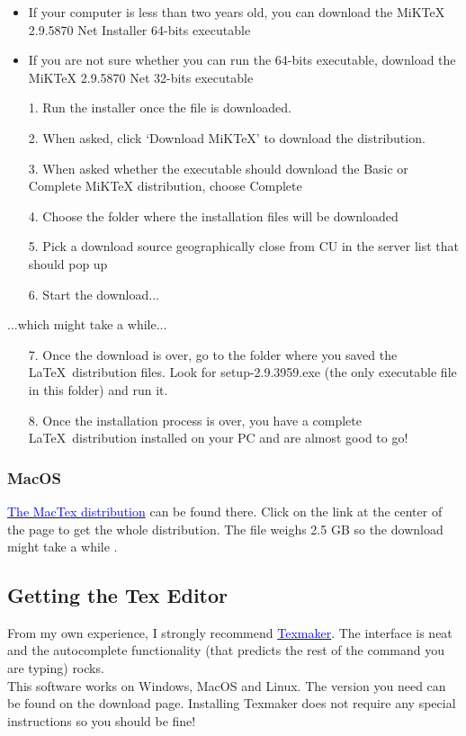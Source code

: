 \documentclass{report}
\begin{document}
\begin{itemize}
\item If your computer is less than two years old,
you can download the MiKTeX 2.9.5870 Net Installer 64-bits executable
\item If you are not sure whether you can run the 64-bits executable, 
download the MiKTeX 2.9.5870 Net 32-bits executable 
\end{itemize}


\begin{itemize}
\item[1.] Run the installer once the file is downloaded.
\item[2.] When asked, click ‘Download MiKTeX’ to download the distribution.
\item[3.] When asked whether the executable should download the Basic or Complete MiKTeX distribution, choose Complete
\item[4.] Choose the folder where the installation files will be downloaded
\item[5.] Pick a download source geographically close from CU in the server list that should pop up
\item[6.] Start the download...
\end{itemize}
...which might take a while...
\begin{itemize}
\item[7.] Once the download is over, go to the folder where you saved the \LaTeX\ distribution files. Look for setup-2.9.3959.exe (the only executable file in this folder) and run it.
\item[8.] Once the installation process is over, you have a complete \LaTeX\ distribution installed on your PC and are almost good to go!
\end{itemize}

\subsubsection*{MacOS}
\href{https://tug.org/mactex/mactex-download.html}{\textcolor{blue}{The MacTex distribution}} can be found there. Click on the link at the center of the page to get the whole distribution. The file weighs 2.5 GB so the download might take a while .

\subsection*{Getting the Tex Editor}
From my own experience, I strongly recommend
\href{http://www.xm1math.net/texmaker/}{\textcolor{blue}{Texmaker}}. The interface is neat and the autocomplete functionality (that predicts the rest of the command you are typing) rocks.\\
This software works on Windows, MacOS and Linux. The version you need can be found on the download page. Installing Texmaker does not require any special instructions so you should be fine!
\end{document}

